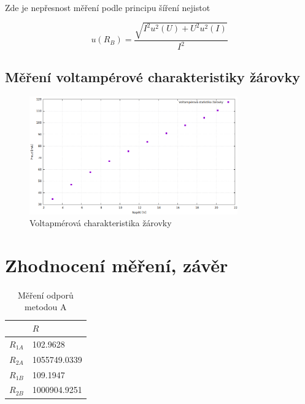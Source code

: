 \documentclass[a4paper,11pt]{article}
\begin{document}
        \paragraph{} Zde je nepřesnost měření podle principu šíření nejistot

        \begin{equation}
            u(R_{B}) = \frac{\sqrt{I^{2} u^{2}(U) + U^{2} u^{2}(I)}}{I^{2}}
        \end{equation}

    \subsection{Měření voltampérové charakteristiky žárovky}

        \begin{figure}[h]
            \centering
            \includegraphics[width=0.8\textwidth]{zarovka1.png}
            \caption{Voltapmérová charakteristika žárovky}
            \label{fig:zarovka}
        \end{figure}

        \paragraph{}

    \section{Zhodnocení měření, závěr}

    \paragraph{} 

        \begin{table}[h]
            \centering
            \begin{tabular}{ | l | l | }
                \hline
                         & $R$                  \\ \hline
                $R_{1A}$ & 102.9628             \\ \hline
                $R_{2A}$ & 1055749.0339         \\ \hline
                $R_{1B}$ & 109.1947             \\ \hline
                $R_{2B}$ & 1000904.9251         \\
                \hline
            \end{tabular}
            \caption{Měření odporů metodou A}
            \label{fig:method_b}
        \end{table}
\end{document}

